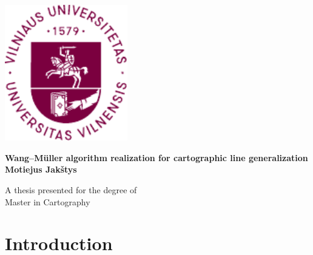 \documentclass[a4paper]{article}
\title{\MYTITLE}
\author{\MYAUTHOR}
\date{\VCDescribe}
\newcommand{\WM}{Wang--M{\"u}ller}
\newcommand{\MYTITLE}{{\WM} algorithm realization for cartographic line generalization}
\newcommand{\MYAUTHOR}{Motiejus Jakštys}
\begin{document}
\begin{titlepage}
    \begin{center}
        \includegraphics[width=0.4\textwidth]{vu}

        \huge
        \textbf{\MYTITLE} \\[4ex]

        \LARGE
        \textbf{\MYAUTHOR} \\[8ex]

        \vfill

        A thesis presented for the degree of\\
        Master in Cartography \\[3ex]

        \large
        \VCDescribe
    \end{center}
\end{titlepage}

\begin{abstract}
\label{sec:abstract}

Currently available line simplification algorithms are rooted in mathematics
    and geometry, and are not fit bendy natural features like rivers and
    coastlines. This paper discusses our implementation of {\WM} algorithm,
    with notes that we would have been appreciated before starting the
    re-implementation endeavor. This paper accompanies our implementation of
    {\WM} algorithm and will be helpful to anyone trying to understand the
    original {\WM} paper, or our implementation.

\end{abstract}

\newpage

\tableofcontents
\listoffigures

\newpage

\section{Introduction}
\label{sec:introduction}
\end{document}
